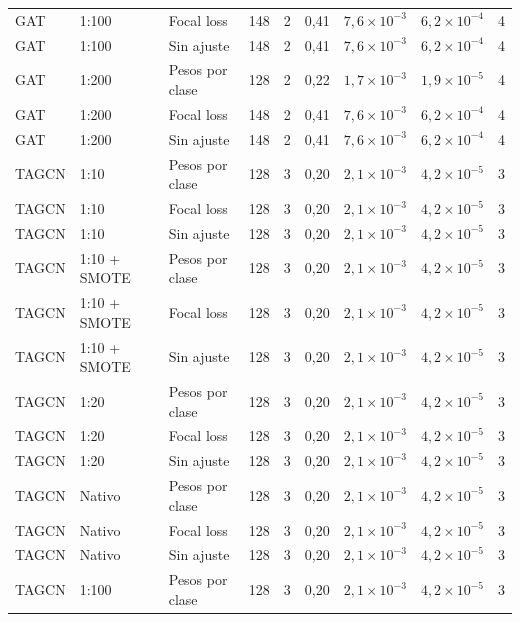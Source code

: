 \begin{longtable}{lllcccccc}
GAT & 1:100 & Focal loss & 148 & 2 & 0{,}41 & $7{,}6 \times 10^{-3}$ & $6{,}2 \times 10^{-4}$ & 4 \\
GAT & 1:100 & Sin ajuste & 148 & 2 & 0{,}41 & $7{,}6 \times 10^{-3}$ & $6{,}2 \times 10^{-4}$ & 4 \\
GAT & 1:200 & Pesos por clase & 128 & 2 & 0{,}22 & $1{,}7 \times 10^{-3}$ & $1{,}9 \times 10^{-5}$ & 4 \\
GAT & 1:200 & Focal loss & 148 & 2 & 0{,}41 & $7{,}6 \times 10^{-3}$ & $6{,}2 \times 10^{-4}$ & 4 \\
GAT & 1:200 & Sin ajuste & 148 & 2 & 0{,}41 & $7{,}6 \times 10^{-3}$ & $6{,}2 \times 10^{-4}$ & 4 \\
\midrule
TAGCN & 1:10 & Pesos por clase & 128 & 3 & 0{,}20 & $2{,}1 \times 10^{-3}$ & $4{,}2 \times 10^{-5}$ & 3 \\
TAGCN & 1:10 & Focal loss & 128 & 3 & 0{,}20 & $2{,}1 \times 10^{-3}$ & $4{,}2 \times 10^{-5}$ & 3 \\
TAGCN & 1:10 & Sin ajuste & 128 & 3 & 0{,}20 & $2{,}1 \times 10^{-3}$ & $4{,}2 \times 10^{-5}$ & 3 \\
TAGCN & 1:10 + SMOTE & Pesos por clase & 128 & 3 & 0{,}20 & $2{,}1 \times 10^{-3}$ & $4{,}2 \times 10^{-5}$ & 3 \\
TAGCN & 1:10 + SMOTE & Focal loss & 128 & 3 & 0{,}20 & $2{,}1 \times 10^{-3}$ & $4{,}2 \times 10^{-5}$ & 3 \\
TAGCN & 1:10 + SMOTE & Sin ajuste & 128 & 3 & 0{,}20 & $2{,}1 \times 10^{-3}$ & $4{,}2 \times 10^{-5}$ & 3 \\
TAGCN & 1:20 & Pesos por clase & 128 & 3 & 0{,}20 & $2{,}1 \times 10^{-3}$ & $4{,}2 \times 10^{-5}$ & 3 \\
TAGCN & 1:20 & Focal loss & 128 & 3 & 0{,}20 & $2{,}1 \times 10^{-3}$ & $4{,}2 \times 10^{-5}$ & 3 \\
TAGCN & 1:20 & Sin ajuste & 128 & 3 & 0{,}20 & $2{,}1 \times 10^{-3}$ & $4{,}2 \times 10^{-5}$ & 3 \\
TAGCN & Nativo & Pesos por clase & 128 & 3 & 0{,}20 & $2{,}1 \times 10^{-3}$ & $4{,}2 \times 10^{-5}$ & 3 \\
TAGCN & Nativo & Focal loss & 128 & 3 & 0{,}20 & $2{,}1 \times 10^{-3}$ & $4{,}2 \times 10^{-5}$ & 3 \\
TAGCN & Nativo & Sin ajuste & 128 & 3 & 0{,}20 & $2{,}1 \times 10^{-3}$ & $4{,}2 \times 10^{-5}$ & 3 \\
TAGCN & 1:100 & Pesos por clase & 128 & 3 & 0{,}20 & $2{,}1 \times 10^{-3}$ & $4{,}2 \times 10^{-5}$ & 3 \\

\end{longtable}
